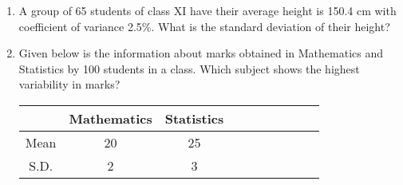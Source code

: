 \documentclass[14pt]{article}
\begin{document}
\begin{multicols}{2}
\begin{enumerate}[resume]
\item A group of 65 students of class XI have their average height is 150.4 cm with coefficient of variance 2.5\%. What is the standard deviation of their height?


\item Given below is the information about marks obtained in Mathematics and Statistics by 100 students in a class. Which subject shows
the highest variability in marks?
\begin{tabular}{|c|*{9}{c|}}
\hline  & Mathematics & Statistics \\
\hline Mean & 20 & 25  \\
\hline S.D. & 2 & 3  \\
\hline
\end{tabular}\\

\end{enumerate} 



\end{multicols}
 
\end{document}
